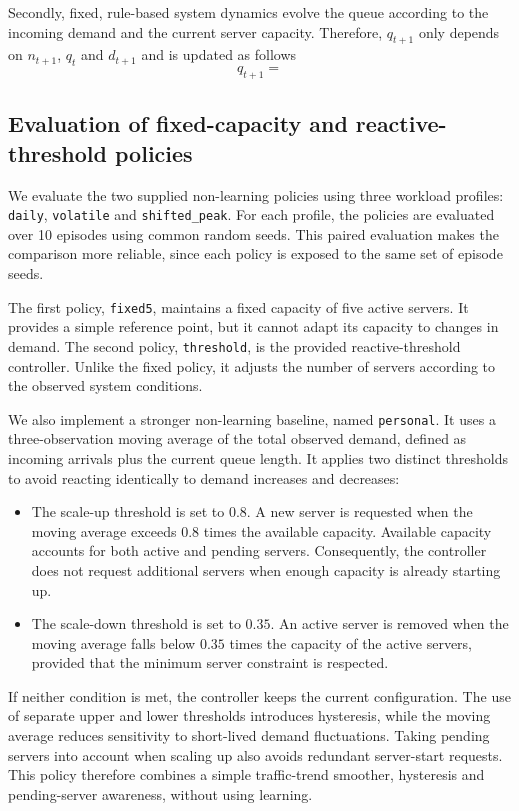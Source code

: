 \documentclass[a4paper,11pt]{article}
\begin{document}
Secondly, fixed, rule-based system dynamics evolve the queue according to the incoming demand and the current server capacity.
Therefore, $q_{t+1}$ only depends on $n_{t+1}$, $q_t$ and $d_{t+1}$ and is updated as follows
\begin{equation*}
    q_{t+1} = 
\end{equation*}

\subsection{Evaluation of fixed-capacity and reactive-threshold policies}

We evaluate the two supplied non-learning policies using three workload
profiles: \texttt{daily}, \texttt{volatile} and \texttt{shifted\_peak}.
For each profile, the policies are evaluated over 10 episodes using common
random seeds. This paired evaluation makes the comparison more reliable,
since each policy is exposed to the same set of episode seeds.

The first policy, \texttt{fixed5}, maintains a fixed capacity of five active
servers. It provides a simple reference point, but it cannot adapt its
capacity to changes in demand. The second policy, \texttt{threshold}, is the
provided reactive-threshold controller. Unlike the fixed policy, it adjusts
the number of servers according to the observed system conditions.

We also implement a stronger non-learning baseline, named
\texttt{personal}. It uses a three-observation moving average of the total
observed demand, defined as incoming arrivals plus the current queue length.
It applies two distinct thresholds to avoid reacting identically to demand
increases and decreases:
\begin{itemize}
    \item The scale-up threshold is set to $0.8$. A new server is requested
    when the moving average exceeds $0.8$ times the available capacity.
    Available capacity accounts for both active and pending servers.
    Consequently, the controller does not request additional servers when
    enough capacity is already starting up.
    \item The scale-down threshold is set to $0.35$. An active server is
    removed when the moving average falls below $0.35$ times the capacity
    of the active servers, provided that the minimum server constraint is
    respected.
\end{itemize}
If neither condition is met, the controller keeps the current configuration.
The use of separate upper and lower thresholds introduces hysteresis, while
the moving average reduces sensitivity to short-lived demand fluctuations.
Taking pending servers into account when scaling up also avoids redundant
server-start requests. This policy therefore combines a simple traffic-trend
smoother, hysteresis and pending-server awareness, without using learning.
\end{document}
